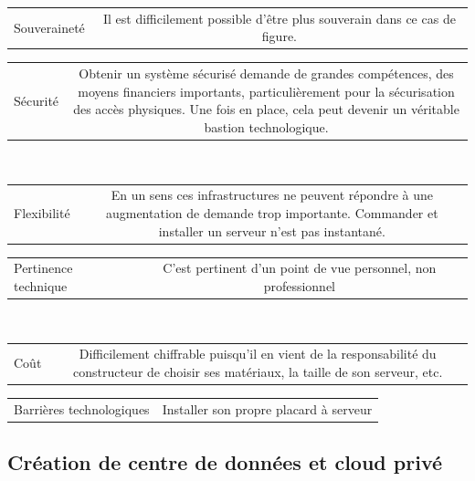 \documentclass[11pt, a4paper ]{article}
\begin{document}
\begin{spacing}{1.5}
\begin{left}
	\hline
	\begin{tabular}{| l | c | }
		Souveraineté & Il est difficilement possible d'être plus souverain dans ce cas de figure. \\
	\end{tabular}
	\begin{tabular}{| l | c | }
		Sécurité & Obtenir un système sécurisé demande de grandes compétences, des moyens financiers importants, particulièrement pour la sécurisation des accès physiques. Une fois en place, cela peut devenir un véritable bastion technologique.\\
	\end{tabular}\\
	\hline
	\begin{tabular}{| l | c | }
		Flexibilité & En un sens ces infrastructures ne peuvent répondre à une augmentation de demande trop importante. Commander et installer un serveur n'est pas instantané. \\
	\end{tabular}
	\begin{tabular}{| l | c | }
		Pertinence technique & C'est pertinent d'un point de vue personnel, non professionnel \\
	\end{tabular}\\
	\hline
	\begin{tabular}{| l | c | }
		Coût & Difficilement chiffrable puisqu'il en vient de la responsabilité du constructeur de choisir ses matériaux, la taille de son serveur, etc.\\
	\end{tabular}
	\begin{tabular}{| l | c | }
		Barrières technologiques & Installer son propre placard à serveur \\
	\end{tabular}
\end{left}

			\subsection{Création de centre de données et cloud privé}




\end{spacing}
\end{document}
